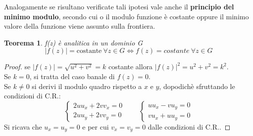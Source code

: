 \documentclass[twoside]{article}
\newtheorem{theorem}{Teorema}[section]
\begin{document}
Analogamente se risultano verificate tali ipotesi vale anche il \textbf{principio del minimo modulo}, secondo cui o il modulo funzione è costante oppure il minimo valore della funzione viene assunto sulla frontiera.\\
\begin{theorem}
f(z) è analitica in un dominio G
\begin{equation}
|f(z)|=\text{costante}\ \forall z \in G \Longleftrightarrow f(z)=costante \ \forall z\in G  
\end{equation}
\end{theorem}
\begin{proof}
se $|f(z)|=\sqrt{u^2+v^2}=k$ costante allora $|f(z)|^2=u^2+v^2=k^2$.\\
Se $k=0$, si tratta del caso banale di $f(z)=0$.\\
Se $k\ne0$ si derivi il modulo quadro rispetto a $x$ e $y$, dopodichè sfruttando le condizioni di C.R.:
\begin{equation}
    \begin{cases}
    2uu_x+2vv_x=0\\
    2uu_y+2vv_y=0
    \end{cases} \qquad
    \begin{cases}
    uu_x-vu_y=0\\
    vu_x+uu_y=0
    \end{cases}
\end{equation}
Si ricava che $u_x=u_y=0$ e per cui $v_x=v_y=0$ dalle condizioni di C.R..
\end{proof}
\end{document}
